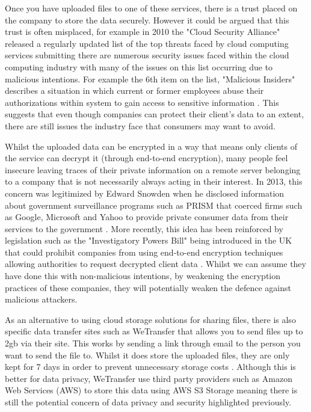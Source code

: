 \documentclass[]{report}
\begin{document}
	Once you have uploaded files to one of these services, there is a trust placed on the company to store the data securely. However it could be argued that this trust is often misplaced, for example in 2010 the "Cloud Security Alliance" released a regularly updated list of the top threats faced by cloud computing services submitting there are numerous security issues faced within the cloud computing industry with many of the issues on this list occurring due to malicious intentions. For example the 6th item on the list, "Malicious Insiders" describes a situation in which current or former employees abuse their authorizations within system to gain access to sensitive information \cite{CSA Top Threats}. This suggests that even though companies can protect their client's data to an extent, there are still issues the industry face that consumers may want to avoid.

 	Whilst the uploaded data can be encrypted in a way that means only clients of the service can decrypt it (through end-to-end encryption), many people feel insecure leaving traces of their private information on a remote server belonging to a company that is not necessarily always acting in their interest. In 2013, this concern was legitimized by Edward Snowden when he disclosed information about government surveillance programs such as PRISM that coerced firms such as Google, Microsoft and Yahoo to provide private consumer data from their services to the government \cite{PRISM}. More recently, this idea has been reinforced by legislation such as the "Investigatory Powers Bill" being introduced in the UK that could prohibit companies from using end-to-end encryption techniques allowing authorities to request decrypted client data \cite{IPB Encryption}. Whilst we can assume they have done this with non-malicious intentions, by weakening the encryption practices of these companies, they will potentially weaken the defence against malicious attackers.
	
	As an alternative to using cloud storage solutions for sharing files, there is also specific data transfer sites such as WeTransfer that allows you to send files up to 2gb via their site. This works by sending a link through email to the person you want to send the file to. Whilst it does store the uploaded files, they are only kept for 7 days in order to prevent unnecessary storage costs \cite{WeTransfer Storage Time}. Although this is better for data privacy, WeTransfer use third party providers such as Amazon Web Services (AWS) to store this data using AWS S3 Storage \cite{WeTransfer AWS Case Study} meaning there is still the potential concern of data privacy and security highlighted previously.
	
\end{document}
